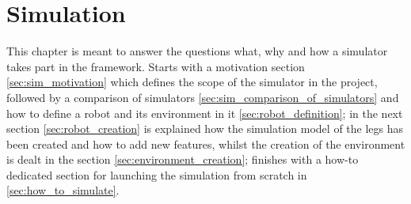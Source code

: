 
\chapter{Simulation} %
\label{cha:simulation}
This chapter is meant to answer the questions what, why and how a simulator takes part in the framework.
Starts with a motivation section \ref{sec:sim_motivation} which defines the scope of the simulator
 in the project, followed by a comparison of simulators \ref{sec:sim_comparison_of_simulators} and how to define a robot and its environment in it \ref{sec:robot_definition}; in the next section \ref{sec:robot_creation} is explained how the simulation model of the legs has been created and how to add new features, whilst the creation of the environment is dealt in the section \ref{sec:environment_creation}; finishes with a how-to dedicated section for launching the simulation from scratch in \ref{sec:how_to_simulate}.








